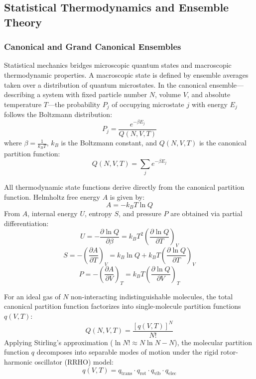 \documentclass[12pt]{article}
\begin{document}
\subsection{Statistical Thermodynamics and Ensemble Theory}

\subsubsection{Canonical and Grand Canonical Ensembles}

Statistical mechanics bridges microscopic quantum states and macroscopic thermodynamic properties. A macroscopic state is defined by ensemble averages taken over a distribution of quantum microstates. In the canonical ensemble—describing a system with fixed particle number $N$, volume $V$, and absolute temperature $T$—the probability $P_j$ of occupying microstate $j$ with energy $E_j$ follows the Boltzmann distribution:
\begin{equation}
P_j = \frac{e^{-\beta E_j}}{Q(N, V, T)}
\end{equation}
where $\beta = \frac{1}{k_B T}$, $k_B$ is the Boltzmann constant, and $Q(N,V,T)$ is the canonical partition function:
\begin{equation}
Q(N, V, T) = \sum_{j} e^{-\beta E_j}
\end{equation}

All thermodynamic state functions derive directly from the canonical partition function. Helmholtz free energy $A$ is given by:
\begin{equation}
A = -k_B T \ln Q
\end{equation}
From $A$, internal energy $U$, entropy $S$, and pressure $P$ are obtained via partial differentiation:
\begin{equation}
U = -\frac{\partial \ln Q}{\partial \beta} = k_B T^2 \left( \frac{\partial \ln Q}{\partial T} \right)_V
\end{equation}
\begin{equation}
S = -\left( \frac{\partial A}{\partial T} \right)_V = k_B \ln Q + k_B T \left( \frac{\partial \ln Q}{\partial T} \right)_V
\end{equation}
\begin{equation}
P = -\left( \frac{\partial A}{\partial V} \right)_T = k_B T \left( \frac{\partial \ln Q}{\partial V} \right)_T
\end{equation}

For an ideal gas of $N$ non-interacting indistinguishable molecules, the total canonical partition function factorizes into single-molecule partition functions $q(V,T)$:
\begin{equation}
Q(N, V, T) = \frac{[q(V,T)]^N}{N!}
\end{equation}
Applying Stirling's approximation ($\ln N! \approx N \ln N - N$), the molecular partition function $q$ decomposes into separable modes of motion under the rigid rotor-harmonic oscillator (RRHO) model:
\begin{equation}
q(V, T) = q_{\text{trans}} \cdot q_{\text{rot}} \cdot q_{\text{vib}} \cdot q_{\text{elec}}
\end{equation}
\end{document}
